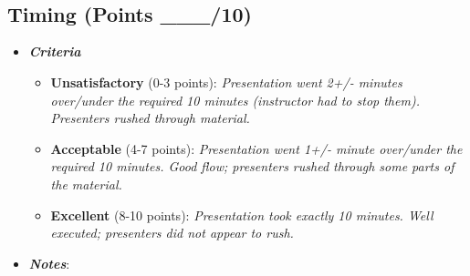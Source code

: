 \documentclass[
]{article}
\providecommand{\tightlist}{%
  \setlength{\itemsep}{0pt}\setlength{\parskip}{0pt}}
\begin{document}
\begin{verbatim}
  
  
  
  
  
  
  
  
  
  
  
\end{verbatim}

\hypertarget{timing-points-___10}{%
\subsection{Timing (Points \_\_\_/10)}\label{timing-points-___10}}

\begin{itemize}
\tightlist
\item
  \textbf{\emph{Criteria}}

  \begin{itemize}
  \tightlist
  \item
    \textbf{Unsatisfactory} (0-3 points): \emph{Presentation went 2+/-
    minutes over/under the required 10 minutes (instructor had to stop
    them). Presenters rushed through material.}
  \item
    \textbf{Acceptable} (4-7 points): \emph{Presentation went 1+/-
    minute over/under the required 10 minutes. Good flow; presenters
    rushed through some parts of the material.}
  \item
    \textbf{Excellent} (8-10 points): \emph{Presentation took exactly 10
    minutes. Well executed; presenters did not appear to rush.}
  \end{itemize}
\item
  \textbf{\emph{Notes}}:
\end{itemize}

\begin{verbatim}
  
  
  
  
  
  
\end{verbatim}
\end{document}
